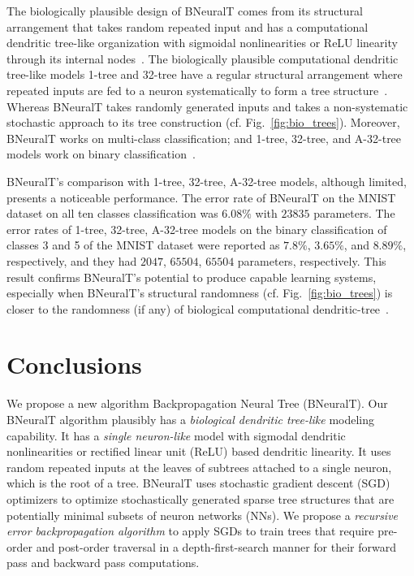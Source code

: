 \documentclass[11pt,a4paper]{article}
\begin{document}
    The biologically plausible design of BNeuralT comes from its structural arrangement that takes random repeated input and has a computational dendritic tree-like organization with sigmoidal nonlinearities or ReLU linearity through its internal nodes~\citep{london2005dendritic}. The biologically plausible computational dendritic tree-like models 1-tree and 32-tree have a regular structural arrangement where repeated inputs are fed to a neuron systematically to form a tree structure~\citep{jones2021might}. Whereas BNeuralT takes randomly generated inputs and takes a non-systematic stochastic approach to its tree construction (cf. Fig.~\ref{fig:bio_trees}). Moreover, BNeuralT works on multi-class classification; and 1-tree, 32-tree, and  A-32-tree models work on binary classification~\citep{jones2021might}.
    
    BNeuralT's comparison with 1-tree,  32-tree, A-32-tree models, although limited, presents a noticeable performance. The error rate of BNeuralT on the MNIST dataset on all ten classes classification was $6.08\%$ with $23835$ parameters. The error rates of 1-tree, 32-tree, A-32-tree models on the binary classification of classes 3 and 5 of the MNIST dataset were reported as $7.8\%$,  $3.65\%$,  and  $8.89\%$, respectively, and they had $2047$, $65504$, $65504$ parameters, respectively. This result confirms BNeuralT's potential to produce capable learning systems, especially when BNeuralT's structural randomness (cf. Fig.~\ref{fig:bio_trees}) is closer to the  randomness (if any) of biological computational dendritic-tree~\citep{travis2005regional}.
    
    
    \section{Conclusions}
    \label{sec:con}
We propose a new algorithm Backpropagation Neural Tree (BNeuralT).  
    Our BNeuralT algorithm plausibly has a \textit{biological dendritic tree-like} modeling capability. It has a \textit{single neuron-like} model with sigmodal dendritic nonlinearities or rectified linear unit (ReLU) based dendritic linearity. It uses random repeated inputs at the leaves of subtrees attached to a single neuron, which is the root of a tree. BNeuralT uses stochastic gradient descent (SGD) optimizers to optimize stochastically generated sparse tree structures that are potentially minimal subsets of neuron networks (NNs). We propose a \textit{recursive error backpropagation algorithm} to apply SGDs to train trees that require pre-order and post-order traversal in a depth-first-search manner for their forward pass and backward pass computations.
    
\end{document}
